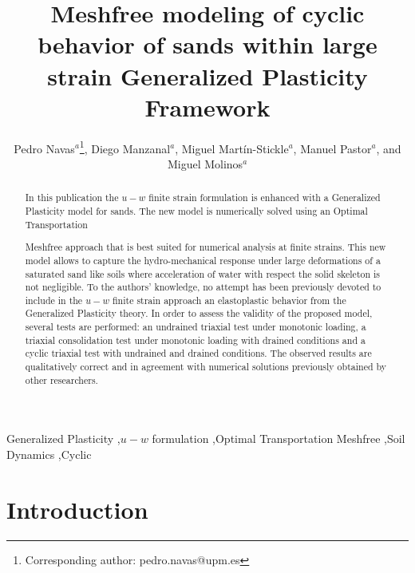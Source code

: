 \documentclass[preprint,12pt,a4paper]{elsarticle}
\begin{document}
\begin{frontmatter}

\title{Meshfree modeling of cyclic behavior of sands within large strain Generalized Plasticity Framework}

\author{
Pedro Navas$^a$\footnote{Corresponding author: pedro.navas@upm.es},
Diego Manzanal$^a$,
Miguel Mart\'in-Stickle$^{a}$,
Manuel Pastor$^a$,
and  Miguel Molinos$^a$
 }
 \address{
 $^a$ ETSI Caminos, Canales y Puertos, Universidad Polit\'ectnica de Madrid.\\ c. Prof. Aranguren 3, 28040 Madrid, Spain
}

\begin{abstract}

In this publication the $u-w$ finite strain formulation is enhanced with a Generalized Plasticity model for sands. The new model is numerically solved using an Optimal Transportation


Meshfree approach that is best suited for numerical analysis at finite strains. This new model allows to capture the hydro-mechanical response under large deformations of a saturated sand like soils where acceleration of water with respect the solid skeleton is not negligible. To the authors' knowledge, no attempt has been previously devoted to include in the $u-w$ finite strain approach an elastoplastic behavior from the Generalized Plasticity theory. In order to assess the validity of the proposed model, several tests are performed: an undrained triaxial test under monotonic loading, a triaxial consolidation test under monotonic loading with drained conditions and a cyclic triaxial test with undrained and drained conditions. The observed results are qualitatively correct and in agreement with numerical solutions previously obtained by other researchers.
\end{abstract}

\begin{keyword}
Generalized Plasticity \sep $u-w$ formulation \sep Optimal Transportation Meshfree \sep Soil Dynamics \sep Cyclic
\end{keyword}

\end{frontmatter}

\linenumbers

\section{Introduction}
\label{sec:1}
\end{document}
